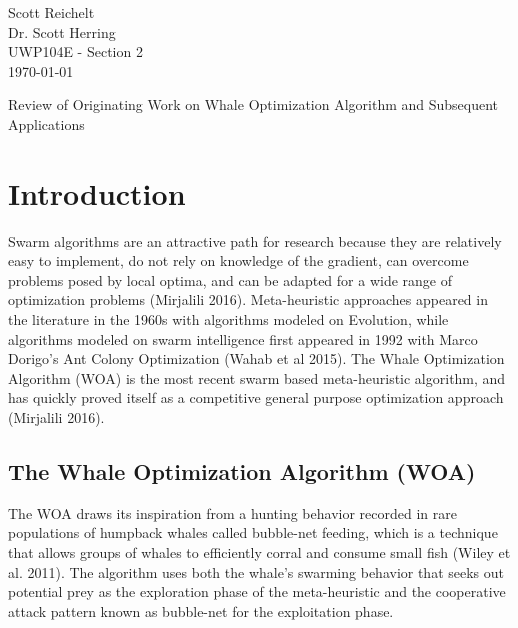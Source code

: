 \documentclass[11pt]{article}
\begin{document}
    \thispagestyle{empty}
    \begin{flushleft}
        Scott Reichelt\\
        Dr. Scott Herring\\
        UWP104E - Section 2\\
        \today\\
    \end{flushleft}
    \vspace{1em}
    \begin{center}
        Review of Originating Work on Whale Optimization Algorithm and Subsequent Applications
    \end{center}

\section*{Introduction}
Swarm algorithms are an attractive path for research because they are relatively easy to implement, do not rely on knowledge of the gradient, can overcome problems posed by local optima, and can be adapted for a wide range of optimization problems (Mirjalili 2016).
Meta-heuristic approaches appeared in the literature in the 1960s with algorithms modeled on Evolution, while algorithms modeled on swarm intelligence first appeared in 1992 with Marco Dorigo's Ant Colony Optimization (Wahab et al 2015).
The Whale Optimization Algorithm (WOA) is the most recent swarm based meta-heuristic algorithm, and has quickly proved itself as a competitive general purpose optimization approach (Mirjalili 2016).

\subsection*{The Whale Optimization Algorithm (WOA)}
The WOA draws its inspiration from a hunting behavior recorded in rare populations of humpback whales called bubble-net feeding, which is a technique that allows groups of whales to efficiently corral and consume small fish (Wiley et al. 2011).
The algorithm uses both the whale's swarming behavior that seeks out potential prey as the exploration phase of the meta-heuristic and the cooperative attack pattern known as bubble-net for the exploitation phase.
\end{document}
